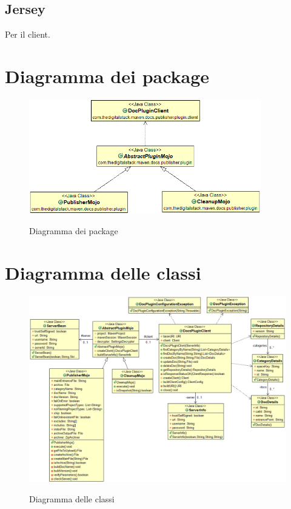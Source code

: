 \subsection*{Jersey}
Per il client.


\section{Diagramma dei package} %
\label{sec:diagramma-package}
\begin{figure}[H]
    \centering
    \includegraphics[width=0.9\textwidth]{immagini/PackageDiagram.png}\\
    \caption{Diagramma dei package}
\end{figure}

\section{Diagramma delle classi}
\label{sec:diagramma-classi}
\begin{figure}[H]
    \centering
    \includegraphics[width=\textwidth]{immagini/ClassD.png}\\
    \caption{Diagramma delle classi}
\end{figure}


